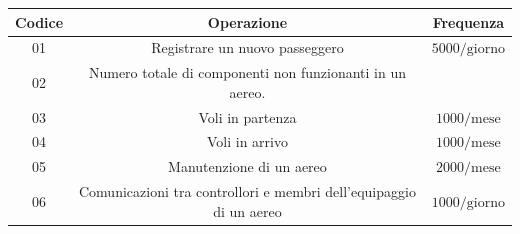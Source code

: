 \begin{tabular}{ | c c c |} %
	\hline
	\textbf{Codice} & \textbf{Operazione} & \textbf{Frequenza} \\
	\hline
	\textsf{\small 01} & \textsf{\small Registrare un nuovo passeggero} & \textsf{\small $5000/\text{giorno}$} \\ %
	\hline
	\textsf{\small 02} & \textsf{\small  Numero totale di componenti non funzionanti in un aereo.} & \textsf{\small $  $} \\ %
	\hline
	\textsf{\small 03} & \textsf{\small Voli in partenza} & \textsf{\small $ 1000 / \text{mese} $} \\
	\hline
	\textsf{\small 04} & \textsf{\small Voli in arrivo} & \textsf{\small $ 1000 / \text{mese} $} \\
	\hline
	\textsf{\small 05} & \textsf{\small Manutenzione di un aereo} & \textsf{\small $ 2000 / \text{mese} $} \\
	\hline
	\textsf{\small 06} & \textsf{\small Comunicazioni tra controllori e membri dell'equipaggio di un aereo} & \textsf{\small $ 1000 / \text{giorno} $} \\
	
	
	
	
	

\end{tabular}
